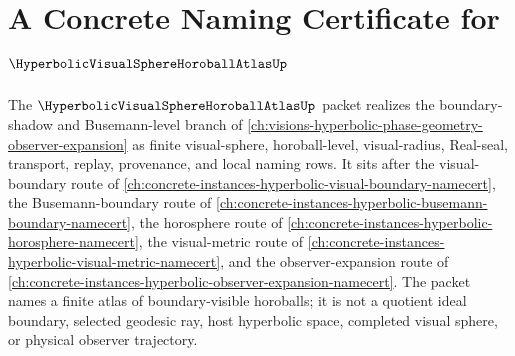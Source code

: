 \chapter{A Concrete Naming Certificate for $\HyperbolicVisualSphereHoroballAtlasUp$}
\label{ch:concrete-instances-hyperbolic-visual-sphere-horoball-atlas-namecert}

The $\HyperbolicVisualSphereHoroballAtlasUp$ packet realizes the boundary-shadow and Busemann-level branch of \autoref{ch:visions-hyperbolic-phase-geometry-observer-expansion} as finite visual-sphere, horoball-level, visual-radius, Real-seal, transport, replay, provenance, and local naming rows. It sits after the visual-boundary route of \autoref{ch:concrete-instances-hyperbolic-visual-boundary-namecert}, the Busemann-boundary route of \autoref{ch:concrete-instances-hyperbolic-busemann-boundary-namecert}, the horosphere route of \autoref{ch:concrete-instances-hyperbolic-horosphere-namecert}, the visual-metric route of \autoref{ch:concrete-instances-hyperbolic-visual-metric-namecert}, and the observer-expansion route of \autoref{ch:concrete-instances-hyperbolic-observer-expansion-namecert}. The packet names a finite atlas of boundary-visible horoballs; it is not a quotient ideal boundary, selected geodesic ray, host hyperbolic space, completed visual sphere, or physical observer trajectory.

